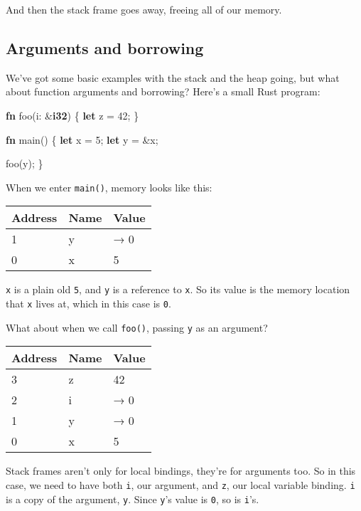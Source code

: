 \documentclass[a4paper,]{book}
\newenvironment{Shaded}{\begin{snugshade}}{\end{snugshade}}
\newcommand{\KeywordTok}[1]{\textcolor[rgb]{0.13,0.29,0.53}{\textbf{{#1}}}}
\newcommand{\DecValTok}[1]{\textcolor[rgb]{0.00,0.00,0.81}{{#1}}}
\newcommand{\NormalTok}[1]{{#1}}
\begin{document}
And then the stack frame goes away, freeing all of our memory.

\subsection{Arguments and borrowing}\label{arguments-and-borrowing}

We've got some basic examples with the stack and the heap going, but
what about function arguments and borrowing? Here's a small Rust
program:

\begin{Shaded}
\begin{Highlighting}[]
\KeywordTok{fn} \NormalTok{foo(i: &}\KeywordTok{i32}\NormalTok{) \{}
    \KeywordTok{let} \NormalTok{z = }\DecValTok{42}\NormalTok{;}
\NormalTok{\}}

\KeywordTok{fn} \NormalTok{main() \{}
    \KeywordTok{let} \NormalTok{x = }\DecValTok{5}\NormalTok{;}
    \KeywordTok{let} \NormalTok{y = &x;}

    \NormalTok{foo(y);}
\NormalTok{\}}
\end{Highlighting}
\end{Shaded}

When we enter \texttt{main()}, memory looks like this:

\begin{longtable}[c]{@{}lll@{}}
\toprule
Address & Name & Value\tabularnewline
\midrule
\endhead
1 & y & → 0\tabularnewline
0 & x & 5\tabularnewline
\bottomrule
\end{longtable}

\texttt{x} is a plain old \texttt{5}, and \texttt{y} is a reference to
\texttt{x}. So its value is the memory location that \texttt{x} lives
at, which in this case is \texttt{0}.

What about when we call \texttt{foo()}, passing \texttt{y} as an
argument?

\begin{longtable}[c]{@{}lll@{}}
\toprule
Address & Name & Value\tabularnewline
\midrule
\endhead
3 & z & 42\tabularnewline
2 & i & → 0\tabularnewline
1 & y & → 0\tabularnewline
0 & x & 5\tabularnewline
\bottomrule
\end{longtable}

Stack frames aren't only for local bindings, they're for arguments too.
So in this case, we need to have both \texttt{i}, our argument, and
\texttt{z}, our local variable binding. \texttt{i} is a copy of the
argument, \texttt{y}. Since \texttt{y}'s value is \texttt{0}, so is
\texttt{i}'s.
\end{document}
